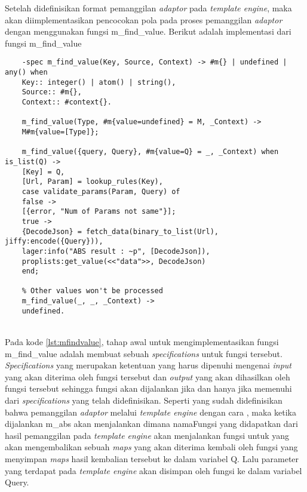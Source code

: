 Setelah didefinisikan format pemanggilan \textit{adaptor} pada \textit{template engine}, maka akan diimplementasikan pencocokan pola pada proses pemanggilan \textit{adaptor} dengan menggunakan fungsi m\_find\_value. Berikut adalah implementasi dari fungsi m\_find\_value

\begin{minipage}{\linewidth}
	\begin{lstlisting}[caption={Implementasi fungsi m\_find\_value},label={lst:mfindvalue}]
	% this method to handle call api from template
	-spec m_find_value(Key, Source, Context) -> #m{} | undefined | any() when
	Key:: integer() | atom() | string(),
	Source:: #m{},
	Context:: #context{}.
	
	m_find_value(Type, #m{value=undefined} = M, _Context) ->
	M#m{value=[Type]};
	
	m_find_value({query, Query}, #m{value=Q} = _, _Context) when is_list(Q) ->
	[Key] = Q,
	[Url, Param] = lookup_rules(Key),
	case validate_params(Param, Query) of
	false ->
	[{error, "Num of Params not same"}];
	true ->
	{DecodeJson} = fetch_data(binary_to_list(Url), jiffy:encode({Query})),
	lager:info("ABS result : ~p", [DecodeJson]),
	proplists:get_value(<<"data">>, DecodeJson)
	end;
	
	% Other values won't be processed
	m_find_value(_, _, _Context) ->
	undefined. 
	\end{lstlisting}
\end{minipage}\\

Pada kode \ref{lst:mfindvalue}, tahap awal untuk mengimplementasikan fungsi m\_find\_value adalah membuat sebuah \textit{specifications} untuk fungsi tersebut. \textit{Specifications} yang merupakan ketentuan yang harus dipenuhi mengenai \textit{input} yang akan diterima oleh fungsi tersebut dan \textit{output} yang akan dihasilkan oleh fungsi tersebut sehingga fungsi akan dijalankan jika dan hanya jika memenuhi dari \textit{specifications} yang telah didefinisikan. Seperti yang sudah didefinisikan bahwa pemanggilan \textit{adaptor} melalui \textit{template engine} dengan cara , maka ketika dijalankan m\_abs akan menjalankan  dimana namaFungsi yang didapatkan dari hasil pemanggilan pada \textit{template engine} akan menjalankan fungsi  untuk yang akan mengembalikan sebuah \textit{maps} yang akan diterima kembali oleh fungsi  yang menyimpan \textit{maps} hasil kembalian tersebut ke dalam variabel Q. Lalu parameter yang terdapat pada \textit{template engine} akan disimpan oleh fungsi  ke dalam variabel Query.

